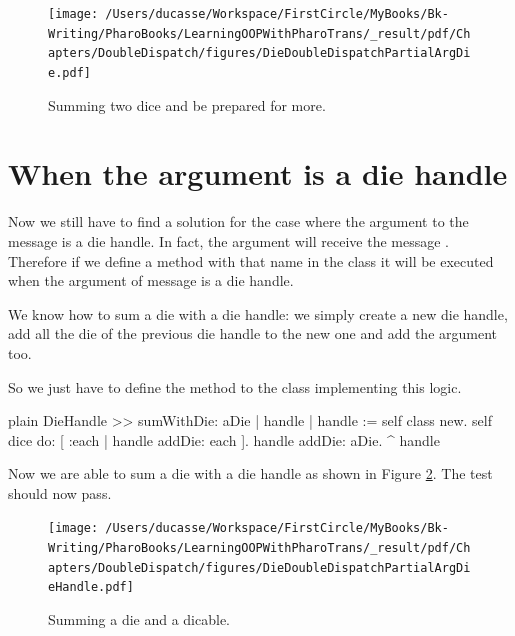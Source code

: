 \documentclass[10pt,twoside,english]{_support/latex/sbabook/sbabook}
\begin{document}
\begin{figure}

\begin{center}
\texttt{[image: /Users/ducasse/Workspace/FirstCircle/MyBooks/Bk-Writing/PharoBooks/LearningOOPWithPharoTrans/\_result/pdf/Chapters/DoubleDispatch/figures/DieDoubleDispatchPartialArgDie.pdf]}\caption{Summing two dice and be prepared for more.\label{figDieDoubleDispatchPartialArgDie}}\end{center}
\end{figure}

\section{When the argument is a die handle}
Now we still have to find a solution for the case where the argument to the message \textcode{+} is a die handle.
In fact, the argument will receive the message . Therefore if we define a method with that name in the class  it will be executed when the argument of message \textcode{+} is a die handle.

We know how to sum a die with a die handle: we simply create a new die handle, add all the die of the previous die handle to the new one and add the argument too. 

So we just have to define the method  to the class  implementing this logic. 

\begin{displaycode}{plain}
DieHandle >> sumWithDie: aDie
	| handle |
	handle := self class new.
	self dice do: [ :each | handle addDie: each ].
	handle addDie: aDie.
	^ handle
\end{displaycode}

Now we are able to sum a die with a die handle as shown in Figure \ref{figDieDoubleDispatchPartialArgDieHandle}. The test  should now pass.


\begin{figure}

\begin{center}
\texttt{[image: /Users/ducasse/Workspace/FirstCircle/MyBooks/Bk-Writing/PharoBooks/LearningOOPWithPharoTrans/\_result/pdf/Chapters/DoubleDispatch/figures/DieDoubleDispatchPartialArgDieHandle.pdf]}\caption{Summing a die and a dicable.\label{figDieDoubleDispatchPartialArgDieHandle}}\end{center}
\end{figure}
\end{document}

